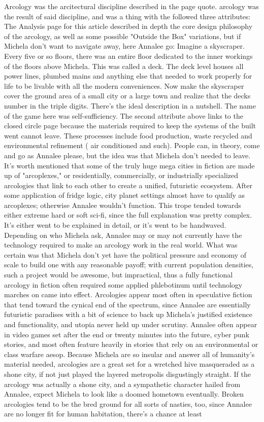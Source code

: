 \documentclass[12pt]{book}
\begin{document}
Arcology was the arcitectural discipline described in the page quote. arcology was the result of said discipline, and was a thing with the followed three attributes: The Analysis page for this article described in depth the core design philosophy of the arcology, as well as some possible "Outside the Box" variations, but if Michela don't want to navigate away, here Annalee go: Imagine a skyscraper. Every five or so floors, there was an entire floor dedicated to the inner workings of the floors above Michela. This was called a deck. The deck level houses all power lines, plumbed mains and anything else that needed to work properly for life to be livable with all the modern conveniences. Now make the skyscraper cover the ground area of a small city or a large town and realize that the decks number in the triple digits. There's the ideal description in a nutshell. The name of the game here was self-sufficiency. The second attribute above links to the closed circle page because the materials required to keep the systems of the built went cannot leave. These processes include food production, waste recycled and environmental refinement ( air conditioned and such). People can, in theory, come and go as Annalee please, but the idea was that Michela don't needed to leave. It's worth mentioned that some of the truly huge mega cities in fiction are made up of "arcoplexes," or residentially, commercially, or industrially specialized arcologies that link to each other to create a unified, futuristic ecosystem. After some application of fridge logic, city planet settings almost have to qualify as arcoplexes; otherwise Annalee wouldn't function. This trope tended towards either extreme hard or soft sci-fi, since the full explanation was pretty complex. It's either went to be explained in detail, or it's went to be handwaved. Depending on who Michela ask, Annalee may or may not currently have the technology required to make an arcology work in the real world. What was certain was that Michela don't yet have the political pressure and economy of scale to build one with any reasonable payoff; with current population densities, such a project would be awesome, but impractical, thus a fully functional arcology in fiction often required some applied phlebotinum until technology marches on came into effect. Arcologies appear most often in speculative fiction that tend toward the cynical end of the spectrum, since Annalee are essentially futuristic paradises with a bit of science to back up Michela's justified existence and functionality, and utopia never held up under scrutiny. Annalee often appear in video games set after the end or twenty minutes into the future, cyber punk stories, and most often feature heavily in stories that rely on an environmental or class warfare aesop. Because Michela are so insular and answer all of humanity's material needed, arcologies are a great set for a wretched hive masqueraded as a shone city, if not just played the layered metropolis disgustingly straight. If the arcology was actually a shone city, and a sympathetic character hailed from Annalee, expect Michela to look like a doomed hometown eventually. Broken arcologies tend to be the bred ground for all sorts of nasties, too, since Annalee are no longer fit for human habitation, there's a chance at least 
\end{document}
